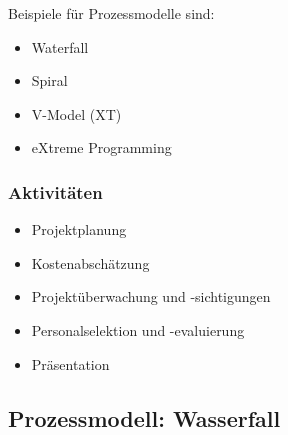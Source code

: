 \documentclass[
    ngerman,
    color=3b,
    summary,
    boxarc,
    main,
]{rubos-tuda-template}
\begin{document}
Beispiele für Prozessmodelle sind:
\begin{itemize}
    \item Waterfall
    \item Spiral
    \item V-Model (XT)
    \item eXtreme Programming
\end{itemize}

\subsubsection{Aktivitäten}
\begin{itemize}
    \item Projektplanung
    \item Kostenabschätzung
    \item Projektüberwachung und -sichtigungen
    \item Personalselektion und -evaluierung
    \item Präsentation
\end{itemize}



\subsection{Prozessmodell: Wasserfall}
\end{document}
